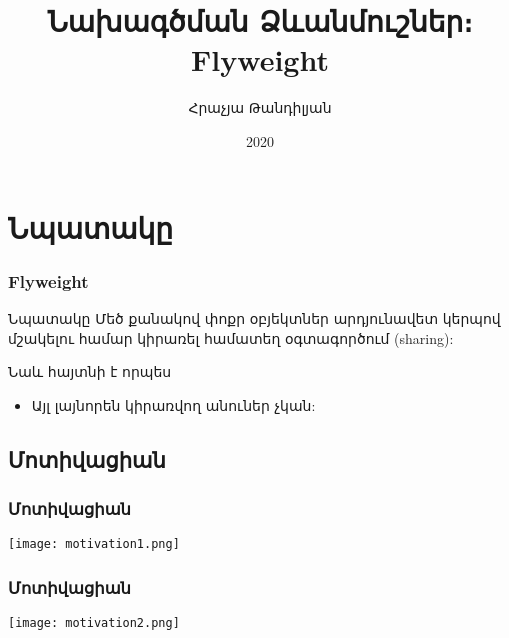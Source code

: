 \documentclass{beamer}
\begin{document}
\title[Flyweight]{Նախագծման Ձևանմուշներ։ Flyweight}
\author[Հրաչյա Թանդիլյան\copyright]{Հրաչյա Թանդիլյան}
\date{2020}

\begin{frame}
\titlepage
\end{frame}

\section{Նպատակը}
\begin{frame}\frametitle{Flyweight}
\begin{block}{Նպատակը}
    Մեծ քանակով փոքր օբյեկտներ արդյունավետ կերպով մշակելու համար կիրառել
    համատեղ օգտագործում (sharing):
\end{block}
\vfill
Նաև հայտնի է որպես
\begin{itemize}
    \item Այլ լայնորեն կիրառվող անուներ չկան:
\end{itemize}
\end{frame}

\subsection{Մոտիվացիան}
\begin{frame}\frametitle{Մոտիվացիան}
\begin{center}
    \texttt{[image: motivation1.png]}
\end{center}
\end{frame}

\begin{frame}\frametitle{Մոտիվացիան}
\begin{center}
    \texttt{[image: motivation2.png]}
\end{center}
\end{frame}
\end{document}

